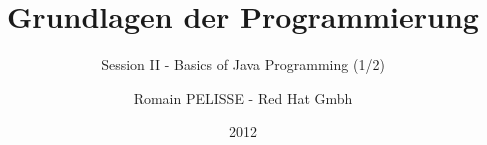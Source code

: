 \documentclass[handout]{beamer}
\title{Grundlagen der Programmierung}
\subtitle{Session II -  Basics of Java Programming (1/2)}
\author{Romain PELISSE - Red Hat Gmbh}
\institute{Humboldt Universität, Berlin}
\date{2012}
\begin{document}
  \begin{frame}
    \titlepage
  \end{frame}

  
\end{document}
